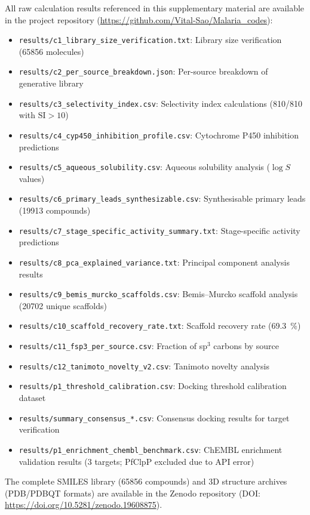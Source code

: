 \documentclass[journal=jcisd8,manuscript=suppinfo]{achemso}
\begin{document}
All raw calculation results referenced in this supplementary material are available in the project repository (\url{https://github.com/Vital-Sao/Malaria_codes}):

\begin{itemize}
  \item \texttt{results/c1\_library\_size\_verification.txt}: Library size verification (\num{65856} molecules)
  \item \texttt{results/c2\_per\_source\_breakdown.json}: Per-source breakdown of generative library
  \item \texttt{results/c3\_selectivity\_index.csv}: Selectivity index calculations (\num{810}/\num{810} with $\text{SI} > \num{10}$)
  \item \texttt{results/c4\_cyp450\_inhibition\_profile.csv}: Cytochrome P450 inhibition predictions
  \item \texttt{results/c5\_aqueous\_solubility.csv}: Aqueous solubility analysis ($\log S$ values)
  \item \texttt{results/c6\_primary\_leads\_synthesizable.csv}: Synthesisable primary leads (\num{19913} compounds)
  \item \texttt{results/c7\_stage\_specific\_activity\_summary.txt}: Stage-specific activity predictions
  \item \texttt{results/c8\_pca\_explained\_variance.txt}: Principal component analysis results
  \item \texttt{results/c9\_bemis\_murcko\_scaffolds.csv}: Bemis--Murcko scaffold analysis (\num{20702} unique scaffolds)
  \item \texttt{results/c10\_scaffold\_recovery\_rate.txt}: Scaffold recovery rate (\qty{69.3}{\percent})
  \item \texttt{results/c11\_fsp3\_per\_source.csv}: Fraction of sp$^3$ carbons by source
  \item \texttt{results/c12\_tanimoto\_novelty\_v2.csv}: Tanimoto novelty analysis
  \item \texttt{results/p1\_threshold\_calibration.csv}: Docking threshold calibration dataset
  \item \texttt{results/summary\_consensus\_*.csv}: Consensus docking results for target verification
  \item \texttt{results/p1\_enrichment\_chembl\_benchmark.csv}: ChEMBL enrichment validation results (3 targets; PfClpP excluded due to API error)
\end{itemize}

The complete SMILES library (\num{65856} compounds) and 3D structure archives (PDB/PDBQT formats) are available in the Zenodo repository (DOI: \url{https://doi.org/10.5281/zenodo.19608875}).
\end{document}
